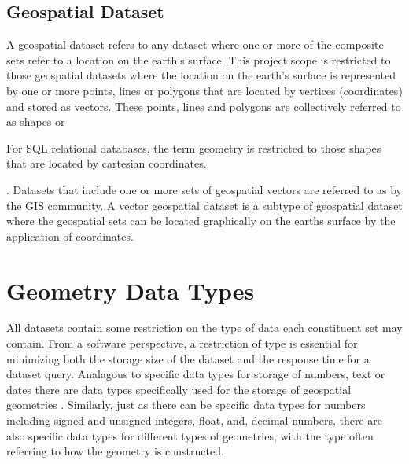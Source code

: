 \documentclass[a4paper,11pt,english]{sphinxmanual}
\begin{document}
\subsection{Geospatial Dataset}
\label{\detokenize{background:geospatial-dataset}}
A geospatial dataset refers to any dataset where one or more of the composite sets refer to a location on the earth’s surface.  This project scope is restricted to those geospatial datasets where the location on the earth’s surface is represented by one or more points, lines or polygons that are located by vertices (coordinates) and stored as vectors.  These points, lines and polygons are collectively referred to as shapes or  %
\begin{footnote}[6]\sphinxAtStartFootnote
For SQL relational databases, the term geometry is restricted to those shapes that are located by cartesian coordinates.
%
\end{footnote}.  Datasets that include one or more sets of geospatial vectors are referred to as  by the GIS community.  A vector geospatial dataset is a subtype of geospatial dataset where the geospatial sets can be located graphically on the earths surface by the application of coordinates.


\section{Geometry Data Types}
\label{\detokenize{background:geometry-data-types}}
All datasets contain some restriction on the type of data each constituent set may contain.  From a software perspective, a restriction of type is essential for minimizing both the storage size of the dataset and the response time for a dataset query.  Analagous to specific data types for storage of numbers, text or dates there are data types specifically used for the storage of geospatial geometries .  Similarly, just as there can be specific data types for numbers including signed and unsigned integers, float, and, decimal numbers, there are also specific data types for different types of geometries, with the type often referring to how the geometry is constructed.
\end{document}

